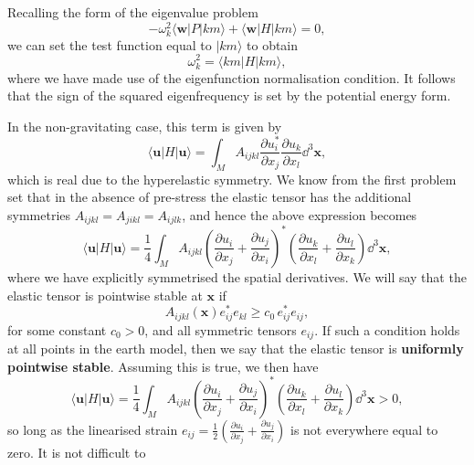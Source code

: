 Recalling the form of the eigenvalue problem
\begin{equation}
-\omega_{k}^{2}\langle \mathbf{w}|P|km\rangle+\langle \mathbf{w}|H|km\rangle=0,
\label{eq:37}
\end{equation}
we can set the test function equal to $|km\rangle$ to obtain
\begin{equation}
\omega_{k}^{2}=\langle km|H|km\rangle,
\label{eq:38}
\end{equation}
where we have made use of the eigenfunction normalisation condition. It follows that the sign of the squared eigenfrequency is set by the potential energy form.

In the non-gravitating case, this term is given by
\begin{equation}
\langle \mathbf{u}|H|\mathbf{u}\rangle=\int_{M}A_{ijkl}\frac{\partial u_{i}^{*}}{\partial x_{j}}\frac{\partial u_{k}}{\partial x_{l}}\dd^{3}\mathbf{x},
\label{eq:39}
\end{equation}
which is real due to the hyperelastic symmetry. We know from the first problem set that in the absence of pre-stress the elastic tensor has the additional 
symmetries $A_{ijkl}=A_{jikl}=A_{ijlk}$, and hence the above expression becomes
\begin{equation}
\langle \mathbf{u}|H|\mathbf{u}\rangle=\frac{1}{4}\int_{M}A_{ijkl}\left(\frac{\partial u_{i}}{\partial x_{j}}
+\frac{\partial u_{j}}{\partial x_{i}}\right)^{*}\left(\frac{\partial u_{k}}{\partial x_{l}}+\frac{\partial u_{l}}{\partial x_{k}}\right)\dd^{3}\mathbf{x},
\label{eq:40}
\end{equation}
where we have explicitly symmetrised the spatial derivatives. We will say that the elastic tensor is pointwise stable at $\mathbf{x}$ if
\begin{equation}
A_{ijkl}(\mathbf{x})e_{ij}^{*}e_{kl}\ge c_{0}\,e_{ij}^{*}e_{ij},
\label{eq:41}
\end{equation}
for some constant $c_{0}>0$, and all symmetric tensors $e_{ij}$. If such a condition holds at all points in the earth model, then we say that the elastic tensor is \textbf{uniformly pointwise stable}.
Assuming this is true, we then have
\begin{equation}
\langle \mathbf{u}|H|\mathbf{u}\rangle=\frac{1}{4}\int_{M}A_{ijkl}\left(\frac{\partial u_{i}}{\partial x_{j}}+\frac{\partial u_{j}}
{\partial x_{i}}\right)^{*}\left(\frac{\partial u_{k}}{\partial x_{l}}+\frac{\partial u_{l}}{\partial x_{k}}\right)\dd^{3}\mathbf{x}>0,
\label{eq:42}
\end{equation}
so long as the linearised strain $e_{ij}=\frac{1}{2}\left(\frac{\partial u_{i}}{\partial x_{j}}+\frac{\partial u_{j}}{\partial x_{i}}\right)$ is not everywhere equal to zero. It is not difficult to 
